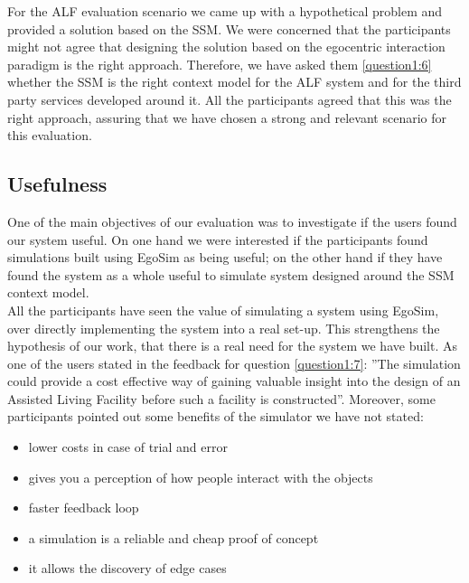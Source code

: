 For the ALF evaluation scenario we came up with a hypothetical problem and provided a solution based on the SSM. We were concerned that the participants might not agree that designing the solution based on the egocentric interaction paradigm is the right approach. Therefore, we have asked them \ref{question1:6} whether the SSM is the right context model for the ALF system and for the third party services developed around it. All the participants agreed that this was the right approach, assuring that we have chosen a strong and relevant scenario for this evaluation.\\

\subsection{Usefulness} %
\label{sec:eval_usefulness}
One of the main objectives of our evaluation was to investigate if the users found our system useful. On one hand we were interested if the participants found simulations built using EgoSim as being useful; on the other hand if they have found the system as a whole useful to simulate system designed around the SSM context model.\\

All the participants have seen the value of simulating a system using EgoSim, over directly implementing the system into a real set-up. This strengthens the hypothesis of our work, that there is a real need for the system we have built. As one of the users stated in the feedback for question \ref{question1:7}: ''The simulation could provide a cost effective way of gaining valuable insight into the design of an Assisted Living Facility before such a facility is constructed''. Moreover, some participants pointed out some benefits of the simulator we have not stated:
\begin{itemize}
	\item lower costs in case of trial and error
	\item gives you a perception of how people interact with the objects
	\item faster feedback loop
	\item a simulation is a reliable and cheap proof of concept
	\item it allows the discovery of edge cases
\end{itemize}


